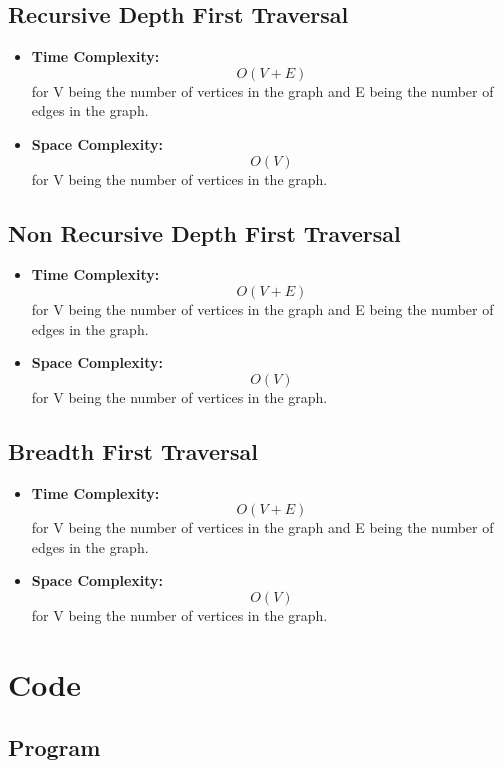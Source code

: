\documentclass[11pt]{article}
\begin{document}
\subsection{Recursive Depth First Traversal}

\begin{itemize}
    \item \textbf{Time Complexity:} \[O(V+E)\] for V being the number of vertices in the graph and E being the number of edges in the graph.
    \item \textbf{Space Complexity:} \[O(V)\] for V being the number of vertices in the graph.
\end{itemize}

\subsection{Non Recursive Depth First Traversal}

\begin{itemize}
    \item \textbf{Time Complexity:} \[O(V+E)\] for V being the number of vertices in the graph and E being the number of edges in the graph.
    \item \textbf{Space Complexity:} \[O(V)\] for V being the number of vertices in the graph.
\end{itemize}


\subsection{Breadth First Traversal}

\begin{itemize}
    \item \textbf{Time Complexity:} \[O(V+E)\] for V being the number of vertices in the graph and E being the number of edges in the graph.
    \item \textbf{Space Complexity:} \[O(V)\] for V being the number of vertices in the graph.
\end{itemize}


\section{Code}

\subsection{Program}

\end{document}
